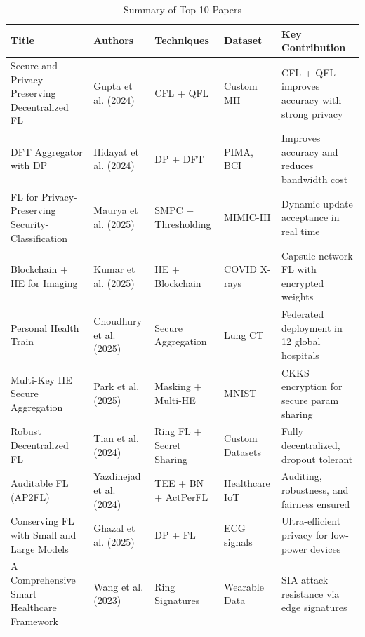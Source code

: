 \documentclass[12pt]{report}
\begin{document}
\begin{table}[h]
    \centering
    \begin{tabular}{|p{4cm}|p{3cm}|p{3cm}|p{2.5cm}|p{4cm}|}
        \hline
        \textbf{Title} & \textbf{Authors} & \textbf{Techniques} & \textbf{Dataset} & \textbf{Key Contribution} \\
        \hline
        Secure and Privacy-Preserving Decentralized FL & Gupta et al. (2024) \cite{gupta2024} & CFL + QFL & Custom MH & CFL + QFL improves accuracy with strong privacy \\
        DFT Aggregator with DP & Hidayat et al. (2024) \cite{hidayat2024} & DP + DFT & PIMA, BCI & Improves accuracy and reduces bandwidth cost \\
        FL for Privacy-Preserving Security-Classification & Maurya et al. (2025) \cite{maurya2025} & SMPC + Thresholding & MIMIC-III & Dynamic update acceptance in real time \\
        Blockchain + HE for Imaging & Kumar et al. (2025) \cite{kumar2025} & HE + Blockchain & COVID X-rays & Capsule network FL with encrypted weights \\
        Personal Health Train & Choudhury et al. (2025) \cite{choudhury2025} & Secure Aggregation & Lung CT & Federated deployment in 12 global hospitals \\
        Multi-Key HE Secure Aggregation & Park et al. (2025) \cite{park2025} & Masking + Multi-HE & MNIST & CKKS encryption for secure param sharing \\
        Robust Decentralized FL & Tian et al. (2024) \cite{tian2024} & Ring FL + Secret Sharing & Custom Datasets & Fully decentralized, dropout tolerant \\
        Auditable FL (AP2FL) & Yazdinejad et al. (2024) \cite{yazdinejad2024} & TEE + BN + ActPerFL & Healthcare IoT & Auditing, robustness, and fairness ensured \\
        Conserving FL with Small and Large Models & Ghazal et al. (2025) \cite{ghazal2025} & DP + FL & ECG signals & Ultra-efficient privacy for low-power devices \\
        A Comprehensive Smart Healthcare Framework & Wang et al. (2023) \cite{wang2023} & Ring Signatures & Wearable Data & SIA attack resistance via edge signatures \\
        \hline
    \end{tabular}
    \caption{Summary of Top 10 Papers}
    \label{tab:top_papers}
\end{table}
\end{document}
